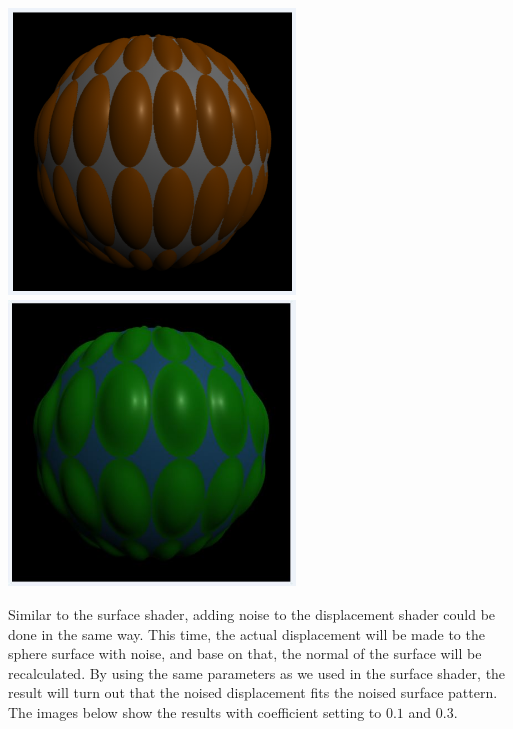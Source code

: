 \documentclass[letterpaper,14pt,titlepage,fleqn]{article}
\begin{document}
\begin{center}
	\includegraphics[width=3in]{disp_mag_0.png}
	\includegraphics*[width=3in]{disp_mag_00.jpg}
\end{center}
Similar to the surface shader, adding noise to the displacement shader could be done in the same way. This time, the actual displacement will be made to the sphere surface with noise, and base on that, the normal of the surface will be recalculated. By using the same parameters as we used in the surface shader, the result will turn out that the noised displacement fits the noised surface pattern. The images below show the results with coefficient setting to $0.1$ and $0.3$.
\end{document}
